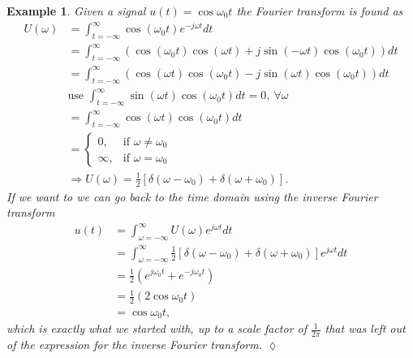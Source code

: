 \documentclass[lecture,12pt,]{pcms-l}
\theoremstyle{example}
\newtheorem{example}{Example}[section]
\newcommand{\tint}{\int_{t=-\infty}^\infty}
\newcommand{\fint}{\int_{\omega=-\infty}^\infty}
\newcommand{\w}{\omega}
\newcommand{\wo}{\omega_0}
\begin{document}
\begin{example}
Given a signal $u(t)=\cos\wo t$ the Fourier transform is found as
\begin{align*}
U(\w) &= \tint \cos(\wo t)e^{-j\w t}dt \\
&= \tint \left(\cos(\wo t)\cos(\w t) + j\sin(-\w t)\cos(\wo t)\right)dt \\
&= \tint \left(\cos(\w t)\cos(\wo t) - j\sin(\w t)\cos(\wo t)\right)dt \\
&\text{use }\tint \sin(\w t)\cos(\wo t)dt = 0, ~ \forall \w \\
&= \tint \cos(\w t)\cos(\wo t)dt \\
&= \begin{cases} 0, & \text{if } \w \neq \wo \\ \infty, & \text{if } \w = \wo \end{cases} \\
&\Rightarrow U(\w) = \frac{1}{2} \left[\delta(\w-\wo) + \delta(\w+\wo)\right].
\end{align*}
If we want to we can go back to the time domain using the inverse Fourier transform
\begin{align*}
u(t) &= \fint U(\w)e^{j\w t}dt \\
&= \fint \frac{1}{2} \left[\delta(\w-\wo) + \delta(\w+\wo)\right] e^{j\w t}dt \\
&= \frac{1}{2}\left(e^{j\wo t} + e^{-j\wo t}\right) \\
&= \frac{1}{2}\left(2\cos\wo t\right) \\
&= \cos\wo t,
\end{align*}
which is exactly what we started with, up to a scale factor of $\frac{1}{2\pi}$ that was left out of the expression for the inverse Fourier transform.
$\lozenge$
\end{example}
\end{document}
